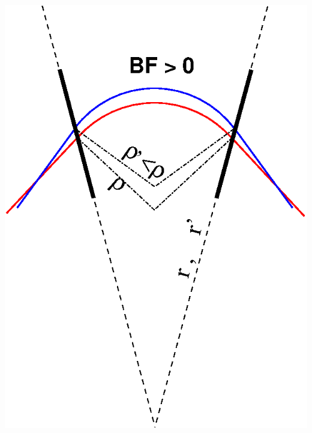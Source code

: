 \documentclass[12pt]{article}
\begin{document}
{\begin{minipage}[b]{.6\linewidth}
\end{minipage}\hspace{15mm}
\begin{minipage}[b]{.19\linewidth}

\mbox{
\includegraphics*[bbllx=0,bblly=100,bburx=252,bbury=323,width=1.1\linewidth]{./figs_FFAG_introSlides/geometry.eps}\hspace{5mm}
}


~



\end{minipage}}
\end{document}
